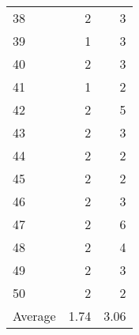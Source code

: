 \documentclass[12pt]{article}
\begin{document}
\begin{longtable}{|l|r|r|}
38 & 2 & 3 \\
39 & 1 & 3 \\
40 & 2 & 3 \\
41 & 1 & 2 \\
42 & 2 & 5 \\
43 & 2 & 3 \\
44 & 2 & 2 \\
45 & 2 & 2 \\
46 & 2 & 3 \\
47 & 2 & 6 \\
48 & 2 & 4 \\
49 & 2 & 3 \\
50 & 2 & 2 \\
\hline
Average & 1.74 & 3.06 \\
\hline
\end{longtable}

\pagebreak
\end{document}
